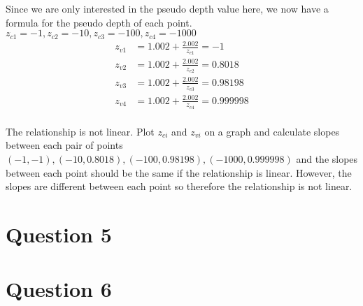 \documentclass{article} %
\begin{document}
Since we are only interested in the pseudo depth value here, we now have a formula for the pseudo depth of each point.
$z_{c1}=-1, z_{c2}=-10, z_{c3} = -100, z_{c4} = -1000$
\begin{align*}
z_{v1} &= 1.002 + \frac{2.002}{z_{c1}} = -1\\
z_{v2} &= 1.002 + \frac{2.002}{z_{c2}} = 0.8018\\
z_{v3} &= 1.002 + \frac{2.002}{z_{c3}} = 0.98198\\
z_{v4} &= 1.002 + \frac{2.002}{z_{c4}} = 0.999998\\
\end{align*}

The relationship is not linear. Plot $z_{ci}$ and $z_{vi}$ on a graph and calculate slopes between each pair of points $(-1, -1), (-10, 0.8018), (-100, 0.98198), (-1000, 0.999998)$ and the slopes between each point should be the same if the relationship is linear. However, the slopes are different between each point so therefore the relationship is not linear.


\newpage
\section{Question 5}


\newpage
\section{Question 6}
\end{document}
